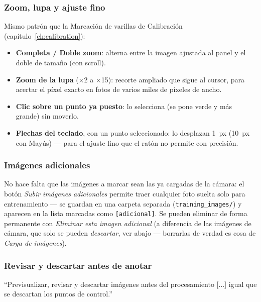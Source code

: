 \subsubsection{Zoom, lupa y ajuste fino}

Mismo patrón que la Marcación de varillas de Calibración (capítulo~\ref{ch:calibration}):

\begin{itemize}[leftmargin=1.5em]
  \item \textbf{Completa / Doble zoom}: alterna entre la imagen ajustada al panel y el doble de
        tamaño (con scroll).
  \item \textbf{Zoom de la lupa} (×2 a ×15): recorte ampliado que sigue al cursor, para acertar
        el píxel exacto en fotos de varios miles de píxeles de ancho.
  \item \textbf{Clic sobre un punto ya puesto}: lo selecciona (se pone verde y más grande) sin
        moverlo.
  \item \textbf{Flechas del teclado}, con un punto seleccionado: lo desplazan 1~px (10~px con
        Mayús) — para el ajuste fino que el ratón no permite con precisión.
\end{itemize}

\subsubsection{Imágenes adicionales}

No hace falta que las imágenes a marcar sean las ya cargadas de la cámara: el botón \textit{Subir
imágenes adicionales} permite traer cualquier foto suelta solo para entrenamiento — se guardan en
una carpeta separada (\texttt{training\_images/}) y aparecen en la lista marcadas como
\texttt{[adicional]}. Se pueden eliminar de forma permanente con \textit{Eliminar esta imagen
adicional} (a diferencia de las imágenes de cámara, que solo se pueden \emph{descartar}, ver
abajo — borrarlas de verdad es cosa de \textit{Carga de imágenes}).

\subsubsection{Revisar y descartar antes de anotar}

\begin{infobox}
``Previsualizar, revisar y descartar imágenes antes del procesamiento [...] igual que se
descartan los puntos de control.''
\end{infobox}

